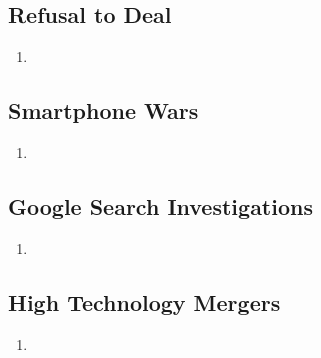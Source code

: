 \subsection{Refusal to Deal} %

\begin{enumerate}
    \item 
\end{enumerate}

\subsection{Smartphone Wars} %

\begin{enumerate}
    \item 
\end{enumerate}

\subsection{Google Search Investigations} %

\begin{enumerate}
    \item 
\end{enumerate}

\subsection{High Technology Mergers} %

\begin{enumerate}
    \item 
\end{enumerate}
